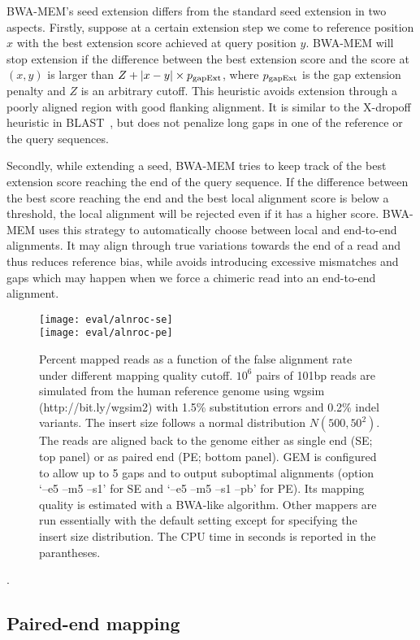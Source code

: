\documentclass{bioinfo}
\begin{document}
\begin{methods}
BWA-MEM's seed extension differs from the standard seed extension in two
aspects. Firstly, suppose at a certain extension step we come to reference
position $x$ with the best extension score achieved at query position $y$.
BWA-MEM will stop extension if the difference between the best extension score
and the score at $(x,y)$ is larger than $Z+|x-y|\times p_{\rm gapExt}$, where
$p_{\rm gapExt}$ is the gap extension penalty and $Z$ is an arbitrary cutoff.
This heuristic avoids extension through a poorly aligned region with good
flanking alignment. It is similar to the X-dropoff heuristic in
BLAST~\citep{Altschul:1997vn}, but does not penalize long gaps in one of the
reference or the query sequences.

Secondly, while extending a seed, BWA-MEM tries to keep track of the best
extension score reaching the end of the query sequence. If the difference
between the best score reaching the end and the best local alignment score is
below a threshold, the local alignment will be rejected even if it has a higher
score. BWA-MEM uses this strategy to automatically choose between local and
end-to-end alignments. It may align through true variations towards the end of
a read and thus reduces reference bias, while avoids introducing excessive
mismatches and gaps which may happen when we force a chimeric read into an
end-to-end alignment.

\begin{figure}[tb]
\centering
\texttt{[image: eval/alnroc-se]}\\
\texttt{[image: eval/alnroc-pe]}
\caption{Percent mapped reads as a function of the false alignment rate under
different mapping quality cutoff. $10^6$ pairs of 101bp reads are simulated
from the human reference genome using wgsim (http://bit.ly/wgsim2) with 1.5\%
substitution errors and 0.2\% indel variants. The insert size follows a normal
distribution $N(500,50^2)$. The reads are aligned back to the genome either as
single end (SE; top panel) or as paired end (PE; bottom panel). GEM is
configured to allow up to 5 gaps and to output suboptimal alignments (option
`--e5 --m5 --s1' for SE and `--e5 --m5 --s1 --pb' for PE). Its mapping quality
is estimated with a BWA-like algorithm. Other mappers are run essentially with
the default setting except for specifying the insert size distribution. The CPU
time in seconds is reported in the parantheses.}\label{fig:eval}
\end{figure}.

\subsection{Paired-end mapping}


\end{methods}
\end{document}
